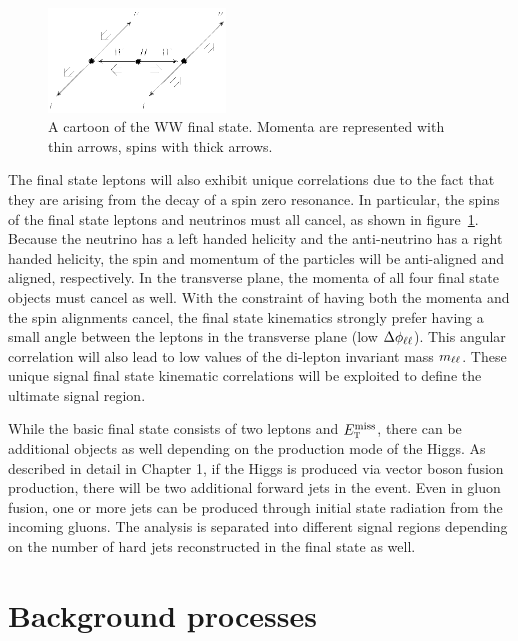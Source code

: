 \begin{figure}
  \vspace{20pt}
  \centering
  \hspace*{-32pt}
  \includegraphics[width=0.42\textwidth]{figures/ww_spins}
  \caption{A cartoon of the WW final state. Momenta are represented with thin arrows, spins with thick arrows. \cite{WW2015}}
  \label{fig:HWWdiagram}
\end{figure}


The final state leptons will also exhibit unique correlations due to the fact that they are arising from the decay of a spin zero resonance. In particular, the spins of the final state leptons and neutrinos must all cancel, as shown in figure~\ref{fig:HWWdiagram}. Because the neutrino has a left handed
helicity and the anti-neutrino has a right handed helicity, the spin and momentum of the particles will be anti-aligned and aligned, respectively. In the transverse plane, the momenta of all four final state objects must cancel as well. With the constraint of having both the momenta and the spin alignments cancel, the final state kinematics strongly prefer having a small angle between the leptons in the transverse plane (low $\Delta\phi_{\ell\ell}$). This angular correlation will also lead to low values of the di-lepton invariant mass $m_{\ell\ell}$. These unique signal final state kinematic correlations will be exploited to define the ultimate signal region. 

While the basic final state consists of two leptons and $E_{\textrm{\footnotesize\sc t}}^{\rm miss}$, there can be additional objects as well depending on the production mode of the Higgs. As described in detail in Chapter 1, if the Higgs is produced via vector boson fusion production, there will be two additional forward jets in the event. Even in gluon fusion, one or more jets can be produced through initial state radiation from the incoming gluons. The analysis is separated into different signal regions depending on the number of hard jets reconstructed in the final state as well.


\section{Background processes}

